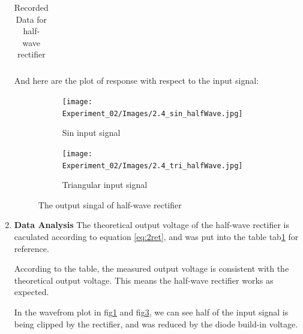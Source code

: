 \begin{enumerate}[I]
\begin{table}[h]
\begin{tabular}{l|cccccccc}
                    \midrule
                \end{tabular}
                \caption{Recorded Data for half-wave rectifier}
                \label{tab:2ret}
            \end{table}
        And here are the plot of response with respect to the input signal:
        \begin{figure}[H]
            \centering
            \begin{subfigure}{0.45\textwidth}
                \texttt{[image: Experiment\_02/Images/2.4\_sin\_halfWave.jpg]}
                \caption{Sin input signal}
                \label{wave:2aSin}
            \end{subfigure}
            \begin{subfigure}{0.45\textwidth}
                \texttt{[image: Experiment\_02/Images/2.4\_tri\_halfWave.jpg]}
                \caption{Triangular input signal}
                \label{wave:2aTri}
            \end{subfigure}
            \caption{The output singal of half-wave rectifier}
        \end{figure}

        \item \textbf{Data Analysis}\newline
            The theoretical output voltage of the half-wave rectifier is caculated according to equation \ref{eq:2ret}, and was put into the table tab\ref{tab:2ret} for reference.\par

            According to the table, the measured output voltage is consistent with the theoretical output voltage. This means the half-wave rectifier works as expected.\par

            In the wavefrom plot in fig\ref{wave:2aSin} and fig\ref{wave:2aTri}, we can see half of the input signal is being clipped by the rectifier, and was reduced by the diode build-in voltage.\par
    \end{enumerate}


